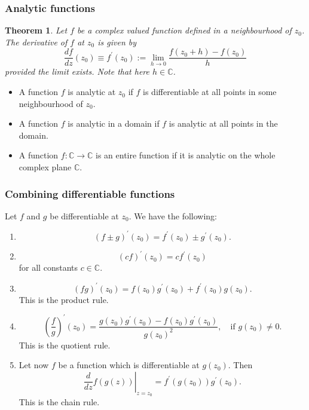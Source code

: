 \documentclass{article}
\newtheorem{theorem}{Theorem}
\begin{document}
\subsubsection{Analytic functions}
\begin{theorem}
    Let $f$ be a complex valued function defined in a neighbourhood of $z_0$. The derivative of $f$ at $z_0$ is given by
    \begin{equation}
        \frac{df}{dz}(z_0)\equiv f^\prime(z_0):=\lim_{h\to 0}\frac{f(z_0+h)-f(z_0)}{h}
    \end{equation}
    provided the limit exists. Note that here $h\in\mathbb{C}$. 
\end{theorem}
\begin{itemize}
    \item A function $f$ is analytic at $z_0$ if $f$ is differentiable at all points in some neighbourhood of $z_0$.
    \item A function $f$ is analytic in a domain if $f$ is analytic at all points in the domain.
    \item A function $f:\mathbb{C}\to\mathbb{C}$ is an entire function if it is analytic on the whole complex plane $\mathbb{C}$.
\end{itemize}

\subsubsection{Combining differentiable functions}
Let $f$ and $g$ be differentiable at $z_0$. We have the following:
\begin{enumerate}
    \item 
    \begin{equation}
        (f\pm g)^\prime (z_0) = f^\prime(z_0)\pm g^\prime(z_0). \nonumber
    \end{equation}
    \item
    \begin{equation}
        (cf)^\prime(z_0)=cf^\prime(z_0) \nonumber
    \end{equation}
    for all constants $c\in\mathbb{C}$.
    \item
    \begin{equation}
        (fg)^\prime(z_0)=f(z_0)g^\prime(z_0)+f^\prime(z_0)g(z_0).
    \end{equation}
    This is the product rule.
    \item
    \begin{equation}
        (\frac{f}{g})^\prime (z_0) = \frac{g(z_0)g^\prime(z_0)-f(z_0)g^\prime(z_0)}{g(z_0)^2},\quad \text{if }g(z_0)\neq 0.
    \end{equation}
    This is the quotient rule.
    \item Let now $f$ be a function which is differentiable at $g(z_0)$. Then
    \begin{equation}
        \left.\frac{d}{dz}f(g(z))\right\rvert_{z=z_0} = f^\prime(g(z_0))g^\prime(z_0).
    \end{equation}
    This is the chain rule.
\end{enumerate}
\end{document}
